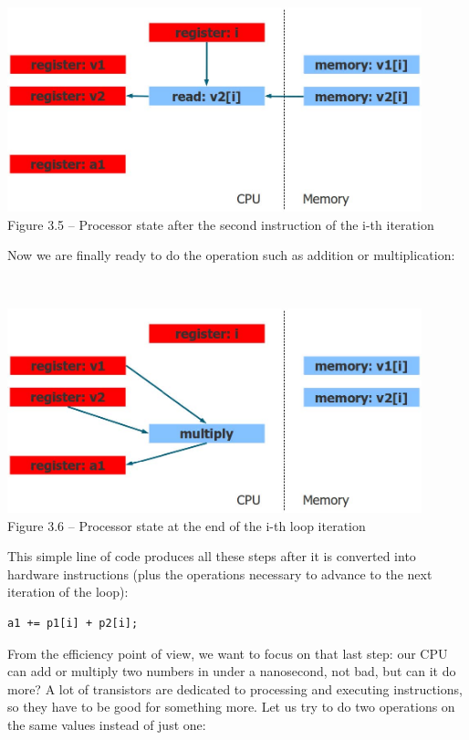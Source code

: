\hspace*{\fill} \\ %
\begin{center}
\includegraphics[width=0.9\textwidth]{content/1/chapter3/images/5.jpg}\\
Figure 3.5 – Processor state after the second instruction of the i-th iteration
\end{center}

Now we are finally ready to do the operation such as addition or multiplication:

\hspace*{\fill} \\ %
\begin{center}
\includegraphics[width=0.9\textwidth]{content/1/chapter3/images/6.jpg}\\
Figure 3.6 – Processor state at the end of the i-th loop iteration
\end{center}

This simple line of code produces all these steps after it is converted into hardware instructions (plus the operations necessary to advance to the next iteration of the loop):

\begin{lstlisting}[style=styleCXX]
a1 += p1[i] + p2[i];
\end{lstlisting}

From the efficiency point of view, we want to focus on that last step: our CPU can add or multiply two numbers in under a nanosecond, not bad, but can it do more? A lot of transistors are dedicated to processing and executing instructions, so they have to be good for something more. Let us try to do two operations on the same values instead of just one:

